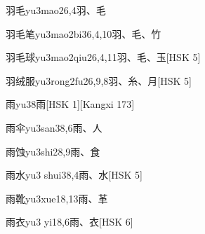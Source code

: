 \begin{EntryWithPhonetic}{羽毛}{yu3mao2}{6,4}{⽻、⽑}
\end{EntryWithPhonetic}

\begin{EntryWithPhonetic}{羽毛笔}{yu3mao2bi3}{6,4,10}{⽻、⽑、⽵}
\end{EntryWithPhonetic}

\begin{EntryWithPhonetic}{羽毛球}{yu3mao2qiu2}{6,4,11}{⽻、⽑、⽟}[HSK 5]
\end{EntryWithPhonetic}

\begin{EntryWithPhonetic}{羽绒服}{yu3rong2fu2}{6,9,8}{⽻、⽷、⽉}[HSK 5]
\end{EntryWithPhonetic}

\begin{EntryWithPhonetic}{雨}{yu3}{8}{⾬}[HSK 1][Kangxi 173]
\end{EntryWithPhonetic}

\begin{EntryWithPhonetic}{雨伞}{yu3san3}{8,6}{⾬、⼈}
\end{EntryWithPhonetic}

\begin{EntryWithPhonetic}{雨蚀}{yu3shi2}{8,9}{⾬、⾷}
\end{EntryWithPhonetic}

\begin{EntryWithPhonetic}{雨水}{yu3 shui3}{8,4}{⾬、⽔}[HSK 5]
\end{EntryWithPhonetic}

\begin{EntryWithPhonetic}{雨靴}{yu3xue1}{8,13}{⾬、⾰}
\end{EntryWithPhonetic}

\begin{EntryWithPhonetic}{雨衣}{yu3 yi1}{8,6}{⾬、⾐}[HSK 6]
\end{EntryWithPhonetic}

